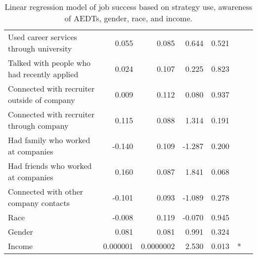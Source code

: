 \begin{table}[ht]
\begin{tabular}{lrrrrrl}
Used career services through university              & 0.055     & 0.085      & 0.644   & 0.521                 &   \\
Talked with people who had recently applied          & 0.024     & 0.107      & 0.225   & 0.823                 &   \\
Connected with recruiter outside of company          & 0.009     & 0.112      & 0.080   & 0.937                 &   \\
Connected with recruiter through company             & 0.115     & 0.088      & 1.314   & 0.191                 &   \\
Had family who worked at companies           & -0.140    & 0.109      & -1.287  & 0.200                 &   \\
Had friends who worked at companies                  & 0.160     & 0.087      & 1.841   & 0.068                 &   \\
Connected with other company contacts                & -0.101    & 0.093     & -1.089  & 0.278                &   \\
Race                                                 & -0.008    & 0.119      & -0.070  & 0.945                 &   \\
Gender                                               & 0.081     & 0.081     & 0.991   & 0.324                 &   \\
Income                                               & 0.000001 & 0.0000002  & 2.530   & 0.013                 & * \\
\bottomrule
\end{tabular}
\caption{\label{tab:jobStats} Linear regression model of job success based on strategy use, awareness of AEDTs, gender, race, and income.}
\end{table}


